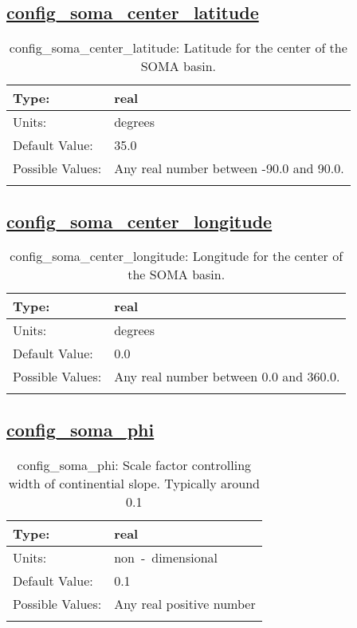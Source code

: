 \subsection[config\_soma\_center\_latitude]{\hyperref[sec:nm_tab_soma]{config\_soma\_center\_latitude}}
\label{subsec:nm_sec_config_soma_center_latitude}
\begin{center}
\begin{longtable}{| p{2.0in} || p{4.0in} |}
    \hline
    Type: & real \\
    \hline
    Units: & \si{degrees} \\
    \hline
    Default Value: & 35.0 \\
    \hline
    Possible Values: & Any real number between -90.0 and 90.0. \\
    \hline
    \caption{config\_soma\_center\_latitude: Latitude for the center of the SOMA basin.}
\end{longtable}
\end{center}
\subsection[config\_soma\_center\_longitude]{\hyperref[sec:nm_tab_soma]{config\_soma\_center\_longitude}}
\label{subsec:nm_sec_config_soma_center_longitude}
\begin{center}
\begin{longtable}{| p{2.0in} || p{4.0in} |}
    \hline
    Type: & real \\
    \hline
    Units: & \si{degrees} \\
    \hline
    Default Value: & 0.0 \\
    \hline
    Possible Values: & Any real number between 0.0 and 360.0. \\
    \hline
    \caption{config\_soma\_center\_longitude: Longitude for the center of the SOMA basin.}
\end{longtable}
\end{center}
\subsection[config\_soma\_phi]{\hyperref[sec:nm_tab_soma]{config\_soma\_phi}}
\label{subsec:nm_sec_config_soma_phi}
\begin{center}
\begin{longtable}{| p{2.0in} || p{4.0in} |}
    \hline
    Type: & real \\
    \hline
    Units: & \si{non-dimensional} \\
    \hline
    Default Value: & 0.1 \\
    \hline
    Possible Values: & Any real positive number \\
    \hline
    \caption{config\_soma\_phi: Scale factor controlling width of continential slope. Typically around 0.1}
\end{longtable}
\end{center}
